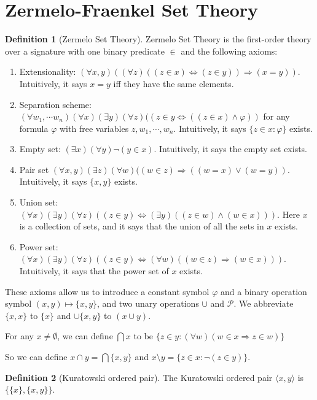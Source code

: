 \documentclass[a4paper]{article}
\theoremstyle{definition}
\newtheorem*{defi}{Definition}
\newcommand{\bra}{\langle}
\newcommand{\ket}{\rangle}
\let\stdsection\section
\renewcommand\section{\newpage\stdsection}
\begin{document}
\section{Zermelo-Fraenkel Set Theory}
\begin{defi}[Zermelo Set Theory]
  Zermelo Set Theory is the first-order theory over a signature with one binary predicate $\in$ and the following axioms:
  \begin{enumerate}
  \item Extensionality: $(\forall x, y)((\forall z)((z\in x)\Leftrightarrow(z\in y)) \Rightarrow (x = y))$. Intuitively, it says $x = y$ iff they have the same elements.
  \item Separation scheme: $(\forall w_1, \cdots w_n)(\forall x)(\exists y)(\forall z)((z\in y\Leftrightarrow ((z\in x)\wedge \varphi))$ for any formula $\varphi$ with free variables $z, w_1, \cdots, w_n$. Intuitively, it says $\{z\in x : \varphi\}$ exists.
  \item Empty set: $(\exists x)(\forall y)\neg (y\in x)$. Intuitively, it says the empty set exists.
  \item Pair set $(\forall x, y)(\exists z)(\forall w)((w\in z)\Rightarrow ((w = x)\vee (w = y))$. Intuitively, it says $\{x, y\}$ exists.
  \item Union set: $(\forall x)(\exists y)(\forall z)((z\in y)\Leftrightarrow (\exists y)((z\in w)\wedge (w\in x)))$. Here $x$ is a collection of sets, and it says that the union of all the sets in $x$ exists.
  \item Power set: $(\forall x)(\exists y)(\forall z)((z\in y)\Leftrightarrow (\forall w)((w\in z)\Rightarrow (w\in x)))$. Intuitively, it says that the power set of $x$ exists.
  \end{enumerate}
\end{defi}

These axioms allow us to introduce a constant symbol $\varphi$ and a binary operation symbol $(x, y)\mapsto \{x, y\}$, and two unary operations $\cup$ and $\mathcal{P}$. We abbreviate $\{x, x\}$ to $\{x\}$ and $\cup \{x, y\}$ to $(x\cup y)$.

For any $x\not= \emptyset$, we can define $\bigcap x$ to be $\{z\in y: (\forall w)(w\in x\Rightarrow z\in w)\}$

So we can define $x\cap y = \bigcap \{x, y\}$ and $x\setminus y = \{z\in x: \neg (z\in y)\}$.

\begin{defi}[Kuratowski ordered pair]
  The Kuratowski ordered pair $\bra x, y\ket$ is $\{\{x\},\{x, y\}\}$.
\end{defi}
\end{document}
